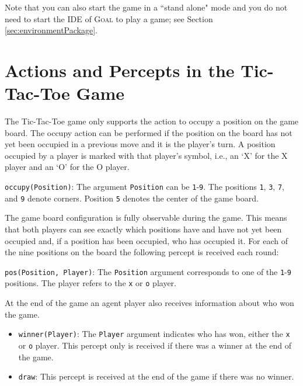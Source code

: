 \documentclass{article}
\newcommand{\GOAL}{\textsc{Goal}\xspace}
\begin{document}
Note that you can also start the game in a ``stand alone" mode and you do not need to start the IDE of \GOAL to play a game; see Section \ref{sec:environmentPackage}.


%
%
%
\section{Actions and Percepts in the Tic-Tac-Toe Game}\label{sec:ActionsAndPercepts}
%
The Tic-Tac-Toe game only supports the action to occupy a position on the game board. The occupy action can be performed if the position on the board has not yet been occupied in a previous move and it is the player's turn. A position occupied by a player is marked with that player's symbol, i.e., an `X' for the X player and an `O' for the O player.

\begin{graybox}
\texttt{occupy(Position)}: The argument \texttt{Position} can be \texttt{1}-\texttt{9}. The positions \texttt{1}, \texttt{3}, \texttt{7}, and \texttt{9} denote corners. Position \texttt{5} denotes the center of the game board.
\end{graybox}

The game board configuration is fully observable during the game. This means that both players can see exactly which positions have and have not yet been occupied and, if a position has been occupied, who has occupied it. For each of the nine positions on the board the following percept is received each round:

\begin{graybox}
\texttt{pos(Position, Player)}: The \texttt{Position} argument corresponds to one of the \texttt{1}-\texttt{9} positions. The player refers to the \texttt{x} or \texttt{o} player.
\end{graybox}

At the end of the game an agent player also receives information about who won the game.

\begin{graybox}
\begin{itemize}
	\item \texttt{winner(Player)}: The \texttt{Player} argument indicates who has won, either the \texttt{x} or \texttt{o} player. This percept only is received if there was a winner at the end of the game.
	\item \texttt{draw}: This percept is received at the end of the game if there was no winner.
\end{itemize}
\end{graybox}
\end{document}
